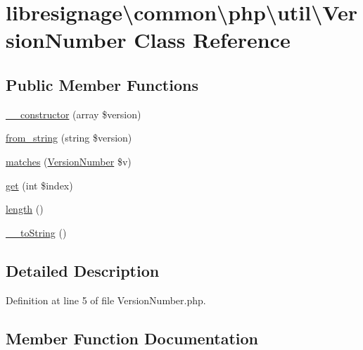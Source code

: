 \hypertarget{classlibresignage_1_1common_1_1php_1_1util_1_1VersionNumber}{}\section{libresignage\textbackslash{}common\textbackslash{}php\textbackslash{}util\textbackslash{}Version\+Number Class Reference}
\label{classlibresignage_1_1common_1_1php_1_1util_1_1VersionNumber}
\subsection*{Public Member Functions}
\begin{DoxyCompactItemize}
\item 
\hyperlink{classlibresignage_1_1common_1_1php_1_1util_1_1VersionNumber_a548a16ba0c81057c55af2e236241b4df}{\+\_\+\+\_\+constructor} (array \$version)
\item 
\hyperlink{classlibresignage_1_1common_1_1php_1_1util_1_1VersionNumber_a1204dc3fcac672c22a03b252f46539ed}{from\+\_\+string} (string \$version)
\item 
\hyperlink{classlibresignage_1_1common_1_1php_1_1util_1_1VersionNumber_ad0c1457b0ed4e5b717435fecf7ed42bc}{matches} (\hyperlink{classlibresignage_1_1common_1_1php_1_1util_1_1VersionNumber}{Version\+Number} \$v)
\item 
\hyperlink{classlibresignage_1_1common_1_1php_1_1util_1_1VersionNumber_a8f0de766123efc0ad42703e06c0dbc4c}{get} (int \$index)
\item 
\hyperlink{classlibresignage_1_1common_1_1php_1_1util_1_1VersionNumber_ab18d4a531529cb6aca27750ccd8fd204}{length} ()
\item 
\hyperlink{classlibresignage_1_1common_1_1php_1_1util_1_1VersionNumber_a09e0e81d2568467b284e59c78e25ab1c}{\+\_\+\+\_\+to\+String} ()
\end{DoxyCompactItemize}


\subsection{Detailed Description}


Definition at line 5 of file Version\+Number.\+php.



\subsection{Member Function Documentation}
\mbox{\label{classlibresignage_1_1common_1_1php_1_1util_1_1VersionNumber_a548a16ba0c81057c55af2e236241b4df}} 
